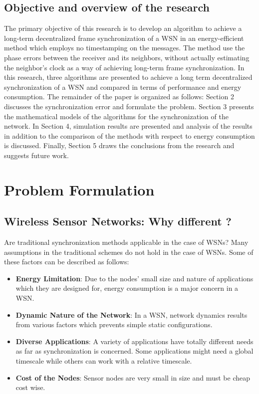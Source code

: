 \documentclass[journal]{IEEEtran}
\begin{document}
\subsection{\textbf{Objective and overview of the research}}\noindent
The primary objective of this research is to develop an algorithm to
achieve a long-term decentralized frame synchronization of a WSN in
an energy-efficient method which employs no timestamping on the
messages. The method use the phase errors between the receiver and
its neighbors, without actually estimating the neighbor's clock as a
way of achieving long-term frame synchronization. In this research,
three algorithms are presented to achieve a long term decentralized
synchronization of a WSN and compared in terms of performance and
energy consumption.
\newline The remainder of the paper is organized as follows:
Section 2 discusses the synchronization error and formulate the problem.
Section 3 presents the mathematical models of the algorithms for the synchronization of the network.
 In Section 4, simulation results are presented and analysis of the results in addition to the comparison of the methods with respect to energy consumption is discussed.
Finally, Section 5 draws the conclusions from the research and suggests future work.
\section{\textbf{Problem Formulation}}
\subsection{\textbf{Wireless Sensor Networks: Why different ?}}
\noindent Are traditional synchronization methods applicable in the case of WSNs? Many
assumptions in the traditional schemes do not hold in the case
of WSNs. Some of these factors can be described as follows:
\begin{itemize}
\item \textbf{Energy Limitation}: Due to the nodes' small size and nature of applications which they
are designed for, energy consumption is a major concern in a WSN.
\item \textbf{Dynamic Nature of the Network}: In a WSN, network
dynamics results from various factors which prevents simple
static configurations.
\item \textbf{Diverse Applications}: A variety of applications
have totally different needs as far as synchronization is concerned.
Some applications might need a global timescale while
others can work with a relative timescale.
\item \textbf{Cost of the Nodes}: Sensor nodes are very small in size
and must be cheap cost wise.
\end{itemize}
\end{document}
